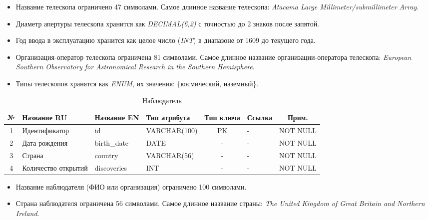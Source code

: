 \documentclass[14pt,a4paper]{extarticle}
\begin{document}
	\begin{itemize}
		\item Название телескопа ограничено 47 символами. Самое длинное название телескопа: \textit{Atacama Large Millimeter/submillimeter Array}.
		\item Диаметр апертуры телескопа хранится как \textit{DECIMAL(6,2)} с точностью до
	2 знаков после запятой.
		\item Год ввода в эксплуатацию хранится как целое число (\textit{INT}) в диапазоне от 1609 до
	текущего года.
		\item Организация-оператор телескопа ограничена 81 символами. Самое длинное название организации-оператора
		телескопа: \textit{European Southern Observatory for Astronomical Research in the Southern Hemisphere}.
		\item Типы телескопов хранятся как \textit{ENUM}, их значения: \{космический,
	наземный\}.
	\end{itemize}

	\begin{table}[H]
		\centering
		\caption{Наблюдатель}
		\small
\begin{tabular}{|c|p{3.2cm}|p{2.6cm}|p{2.8cm}|c|p{2.5cm}|c|}
\hline
№ & Название RU & Название EN & Тип атрибута & Тип ключа & Ссылка & Прим. \\
\hline
1 & Идентификатор & id & VARCHAR(100) & PK & - & NOT NULL \\
2 & Дата рождения & birth_date & DATE & - & - & NOT NULL \\
3 & Страна & country & VARCHAR(56) & - & - & NOT NULL \\
4 & Количество открытий & discoveries & INT & - & - & NOT NULL \\
\hline
\end{tabular}
	\end{table}

	\begin{itemize}
		\item Название наблюдателя (ФИО или организация) ограничено 100 символами.
		\item Страна наблюдателя ограничена 56 символами. Самое длинное название страны:
		\textit{The United Kingdom of Great Britain and Northern Ireland}.
	\end{itemize}
\end{document}
